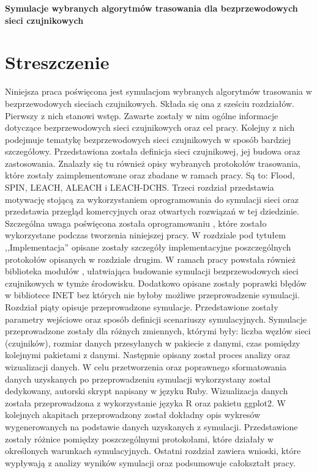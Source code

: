 \newpage
\begin{center}
\large \bf
Symulacje wybranych algorytmów trasowania dla bezprzewodowych sieci czujnikowych
\end{center}

\section*{Streszczenie}
Niniejsza praca poświęcona jest symulacjom wybranych algorytmów trasowania w bezprzewodowych sieciach czujnikowych. Składa się ona z sześciu rozdziałów. Pierwszy z nich stanowi wstęp. Zawarte zostały w nim ogólne informacje dotyczące bezprzewodowych sieci czujnikowych oraz cel pracy. Kolejny z nich podejmuje tematykę bezprzewodowych sieci czujnikowych w sposób bardziej szczegółowy. Przedstawiona została definicja sieci czujnikowej, jej budowa oraz zastosowania. Znalazły się tu również opisy wybranych protokołów trasowania, które zostały zaimplementowane oraz zbadane w ramach pracy. Są to: Flood, SPIN, LEACH, ALEACH i LEACH-DCHS. Trzeci rozdział przedstawia motywację stojącą za wykorzystaniem oprogramowania do symulacji sieci oraz przedstawia przegląd komercyjnych oraz otwartych rozwiązań w tej dziedzinie. Szczególna uwaga poświęcona została oprogramowaniu \omnetpp, które zostało wykorzystane podczas tworzenia niniejszej pracy. W rozdziale pod tytułem ,,Implementacja'' opisane zostały szczegóły implementacyjne poszczególnych protokołów opisanych w rozdziale drugim. W ramach pracy powstała również biblioteka modułów \omenetpp, ułatwiająca budowanie symulacji bezprzewodowych sieci czujnikowych w tymże środowisku. Dodatkowo opisane zostały poprawki błędów w bibliotece INET bez których nie byłoby możliwe przeprowadzenie symulacji. Rozdział piąty opisuje przeprowadzone symulacje. Przedstawione zostały parametry wejściowe oraz sposób definicji scenariuszy symulacyjnych. Symulacje przeprowadzone zostały dla różnych zmiennych, którymi były: liczba węzłów sieci (czujników), rozmiar danych przesyłanych w pakiecie z danymi, czas pomiędzy kolejnymi pakietami z danymi. Następnie opisany został proces analizy oraz wizualizacji danych. W celu przetworzenia oraz poprawnego sformatowania danych uzyskanych po przeprowadzeniu symulacji wykorzystany został dedykowany, autorski skrypt napisany w języku Ruby. Wizualizacja danych została przeprowadzona z wykorzystanie języka R oraz pakietu ggplot2. W kolejnych akapitach przeprowadzony został dokładny opis wykresów wygenerowanych na podstawie danych uzyskanych z symulacji. Przedstawione zostały różnice pomiędzy poszczególnymi protokołami, które działały w określonych warunkach symulacyjnych. Ostatni rozdział zawiera wnioski, które wypływają z analizy wyników symulacji oraz podsumowuje całokształt pracy.

